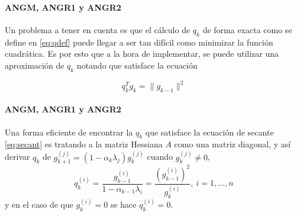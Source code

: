 \begin{frame}{\insertsectionhead}
    \framesubtitle{ANGM, ANGR1 y ANGR2}
    Un problema a tener en cuenta es que el cálculo de $q_k$ de forma exacta como se define en \ref{eq:qdef} puede llegar a ser tan difícil como minimizar la función cuadrática. Es por esto que a la hora de implementar, se puede utilizar una aproximación de $q_k$ notando que satisface la ecuación

    \begin{equation}
        q_k^Tg_k = \|g_{k-1}\|^2
        \label{eq:secant}
    \end{equation}
\end{frame}

\begin{frame}{\insertsectionhead}
    \framesubtitle{ANGM, ANGR1 y ANGR2}
    Una forma eficiente de encontrar la $q_k$ que satisface la ecuación de secante \ref{eq:secant} es tratando a la matriz Hessiana $A$ como una matriz diagonal, y así derivar $q_k$ de $g_{k+1}^{(j)} = (1-\alpha_k\lambda_j)g_k^{(j)}$ cuando $g_k^{(j)}\neq 0$,
    \begin{equation}
        q_k^{(i)} = \frac{g_{k-1}^{(i)}}{1-\alpha_{k-1}\lambda_i} = \frac{(g_{k-1}^{(i)})^2}{g_k^{(i)}}, \ i=1, ..., n
    \end{equation}
    y en el caso de que $g_k^{(i)}=0$ se hace $q_k^{(i)}=0$.
\end{frame}